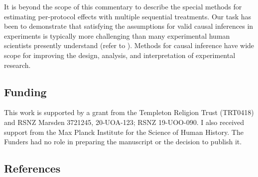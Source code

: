 \documentclass[
  single column]{article}
\begin{document}
It is beyond the scope of this commentary to describe the special
methods for estimating per-protocol effects with multiple sequential
treatments. Our task has been to demonstrate that satisfying the
assumptions for valid causal inferences in experiments is typically more
challenging than many experimental human scientists presently understand
(refer to ).
Methods for causal inference have wide scope for improving the design,
analysis, and interpretation of experimental research.

\newpage{}

\subsection{Funding}\label{funding}

This work is supported by a grant from the Templeton Religion Trust
(TRT0418) and RSNZ Marsden 3721245, 20-UOA-123; RSNZ 19-UOO-090. I also
received support from the Max Planck Institute for the Science of Human
History. The Funders had no role in preparing the manuscript or the
decision to publish it.

\newpage{}

\subsection{References}\label{references}
\end{document}
